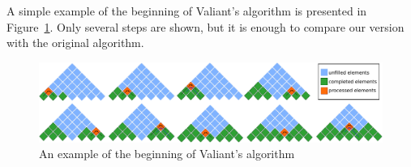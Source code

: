 A simple example of the beginning of Valiant's algorithm is presented in Figure~\ref{fig3}.
Only several steps are shown, but it is enough to compare our version with the original algorithm.

\begin{figure}
\vspace{3mm}
 \begin{center}
 \includegraphics[width=12cm]{pictures/valbeg2.pdf}
    \caption{An example of the beginning of Valiant's algorithm}
    \label{fig3}
\end{center}
\vspace{-8mm}
\end{figure}





